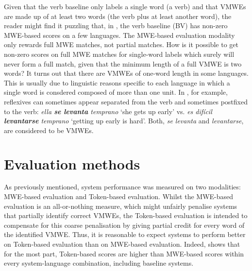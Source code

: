 \documentclass[output=paper,modfonts,nonflat,draftmode]{langsci/langscibook}
\begin{document}
Given that the verb baseline only labels a single word (a verb) and that VMWEs are made up of at least two words (the verb plus at least another word), the reader might find it puzzling that, in , the verb baseline (BV) has non-zero MWE-based scores on a few languages. The MWE-based evaluation modality only rewards full MWE matches, not partial matches. How is it possible to get non-zero scores on full MWE matches for single-word labels which surely will never form a full match, given that the minimum length of a full VMWE is two words? It turns out that there are VMWEs of one-word length in some languages. This is usually due to linguistic reasons specific to each language in which a single word is consdered composed of more than one unit. In , for example, reflexives can sometimes appear separated from the verb and sometimes postfixed to the verb: \emph{ella \textbf{se \mbox{levanta}} \mbox{temprano}} `she gets up early' vs. \emph{es \mbox{difícil} \textbf{\mbox{levantarse}} \mbox{temprano}} `getting up early is hard'. Both, \emph{se levanta} and \emph{levantarse}, are considered to be VMWEs. 



\section{\label{sec:eval-methods}Evaluation methods}

As previously mentioned, system performance was measured on two modalities: MWE-based evaluation and Token-based evaluation. Whilst the MWE-based evaluation is an all-or-nothing measure, which might unfairly penalise systems that partially identify correct VMWEs, the Token-based evaluation is intended to compensate for this coarse penalisation by giving partial credit for every word of the identified VMWE. Thus, it is reasonable to expect systems to perform better on Token-based evaluation than on MWE-based evaluation. Indeed,  shows that for the most part, Token-based scores are higher than MWE-based scores within every system-language combination, including baseline systems.
\end{document}
